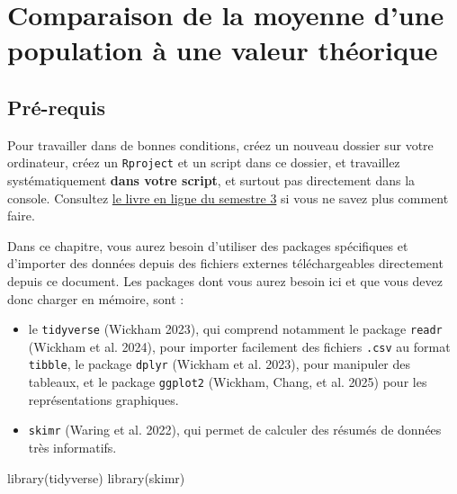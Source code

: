 \documentclass[
  french,
  a4paper,
  DIV=11,
  numbers=noendperiod,
  oneside]{scrreprt}
\newenvironment{Shaded}{}{}
\newcommand{\FunctionTok}[1]{\textcolor[rgb]{0.44,0.26,0.76}{#1}}
\newcommand{\NormalTok}[1]{\textcolor[rgb]{0.14,0.16,0.18}{#1}}
\providecommand{\tightlist}{%
  \setlength{\itemsep}{0pt}\setlength{\parskip}{0pt}}
\begin{document}

\chapter{Comparaison de la moyenne d'une population à une valeur
théorique}\label{sec-moy1}

\section{Pré-requis}\label{sec-packages}

Pour travailler dans de bonnes conditions, créez un nouveau dossier sur
votre ordinateur, créez un \texttt{Rproject} et un script dans ce
dossier, et travaillez systématiquement \textbf{dans votre script}, et
surtout pas directement dans la console. Consultez
\href{https://besibo.github.io/BiometrieS3/01-R-basics.html\#sec-code}{le
livre en ligne du semestre 3} si vous ne savez plus comment faire.

Dans ce chapitre, vous aurez besoin d'utiliser des packages spécifiques
et d'importer des données depuis des fichiers externes téléchargeables
directement depuis ce document. Les packages dont vous aurez besoin ici
et que vous devez donc charger en mémoire, sont :

\begin{itemize}
\tightlist
\item
  le \texttt{tidyverse} (Wickham 2023), qui comprend notamment le
  package \texttt{readr} (Wickham et al. 2024), pour importer facilement
  des fichiers \texttt{.csv} au format \texttt{tibble}, le package
  \texttt{dplyr} (Wickham et al. 2023), pour manipuler des tableaux, et
  le package \texttt{ggplot2} ({Wickham, Chang, et al.} 2025) pour les
  représentations graphiques.
\item
  \texttt{skimr} (Waring et al. 2022), qui permet de calculer des
  résumés de données très informatifs.
\end{itemize}

\begin{Shaded}
\begin{Highlighting}[]
\FunctionTok{library}\NormalTok{(tidyverse)}
\FunctionTok{library}\NormalTok{(skimr)}
\end{Highlighting}
\end{Shaded}
\end{document}
